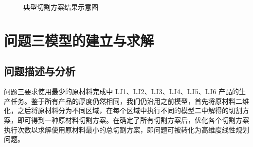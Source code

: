 \documentclass{whutmod}
\begin{document}
		\begin{figure}[H]
			\centering
				\caption{典型切割方案结果示意图}
		\end{figure}
%
  
    \section{问题三模型的建立与求解}
    	\subsection{问题描述与分析}
        问题三要求使用最少的原材料完成中 LJ1、LJ2、LJ3、LJ4、LJ5、LJ6 产品的生产任务。鉴于所有产品的厚度仍然相同，我们仍沿用之前模型，首先将原材料二维化，之后将原材料分为不同区域，在每个区域中执行不同的模型二中解得的切割方案，即可得到一种原材料切割方案。在确定了所有切割方案后，优化各个切割方案执行次数以求解使用原材料最小的总切割方案，即问题可被转化为高维度线性规划问题。
        
\end{document}

